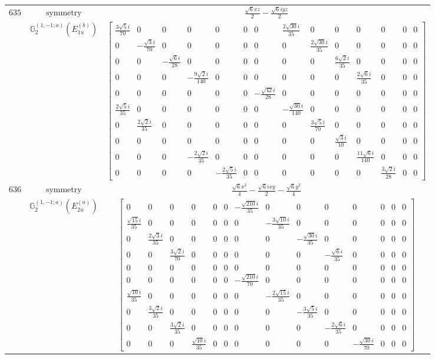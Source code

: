 \documentclass[fleqn,8pt,landscape]{jsarticle}
\begin{document}
\begin{longtable}{ccc}
$ 635 $ & $ \text{symmetry} $ & $ \frac{\sqrt{6} x z}{2} - \frac{\sqrt{6} i y z}{2} $ \\
$  $ & $ \mathbb{G}_{2}^{(1,-1;a)}(E_{1u}^{(b)}) $ & $ \begin{bmatrix} \frac{3 \sqrt{5} i}{70} & 0 & 0 & 0 & 0 & 0 & 0 & \frac{2 \sqrt{30} i}{35} & 0 & 0 & 0 & 0 & 0 & 0 \\ 0 & - \frac{\sqrt{3} i}{70} & 0 & 0 & 0 & 0 & 0 & 0 & \frac{2 \sqrt{30} i}{35} & 0 & 0 & 0 & 0 & 0 \\ 0 & 0 & - \frac{\sqrt{6} i}{28} & 0 & 0 & 0 & 0 & 0 & 0 & \frac{6 \sqrt{2} i}{35} & 0 & 0 & 0 & 0 \\ 0 & 0 & 0 & - \frac{9 \sqrt{2} i}{140} & 0 & 0 & 0 & 0 & 0 & 0 & \frac{2 \sqrt{6} i}{35} & 0 & 0 & 0 \\ 0 & 0 & 0 & 0 & 0 & 0 & - \frac{\sqrt{42} i}{28} & 0 & 0 & 0 & 0 & 0 & 0 & 0 \\ \frac{2 \sqrt{5} i}{35} & 0 & 0 & 0 & 0 & 0 & 0 & - \frac{\sqrt{30} i}{140} & 0 & 0 & 0 & 0 & 0 & 0 \\ 0 & \frac{2 \sqrt{2} i}{35} & 0 & 0 & 0 & 0 & 0 & 0 & \frac{3 \sqrt{5} i}{70} & 0 & 0 & 0 & 0 & 0 \\ 0 & 0 & 0 & 0 & 0 & 0 & 0 & 0 & 0 & \frac{\sqrt{3} i}{10} & 0 & 0 & 0 & 0 \\ 0 & 0 & 0 & - \frac{2 \sqrt{2} i}{35} & 0 & 0 & 0 & 0 & 0 & 0 & \frac{11 \sqrt{6} i}{140} & 0 & 0 & 0 \\ 0 & 0 & 0 & 0 & - \frac{2 \sqrt{5} i}{35} & 0 & 0 & 0 & 0 & 0 & 0 & \frac{3 \sqrt{2} i}{28} & 0 & 0 \end{bmatrix} $ \\ \hline
$ 636 $ & $ \text{symmetry} $ & $ \frac{\sqrt{6} x^{2}}{4} - \frac{\sqrt{6} i x y}{2} - \frac{\sqrt{6} y^{2}}{4} $ \\
$  $ & $ \mathbb{G}_{2}^{(1,-1;a)}(E_{2u}^{(a)}) $ & $ \begin{bmatrix} 0 & 0 & 0 & 0 & 0 & 0 & - \frac{\sqrt{210} i}{35} & 0 & 0 & 0 & 0 & 0 & 0 & 0 \\ \frac{\sqrt{15} i}{35} & 0 & 0 & 0 & 0 & 0 & 0 & - \frac{3 \sqrt{10} i}{35} & 0 & 0 & 0 & 0 & 0 & 0 \\ 0 & \frac{2 \sqrt{3} i}{35} & 0 & 0 & 0 & 0 & 0 & 0 & - \frac{\sqrt{30} i}{35} & 0 & 0 & 0 & 0 & 0 \\ 0 & 0 & \frac{3 \sqrt{2} i}{70} & 0 & 0 & 0 & 0 & 0 & 0 & - \frac{\sqrt{6} i}{35} & 0 & 0 & 0 & 0 \\ 0 & 0 & 0 & 0 & 0 & 0 & 0 & 0 & 0 & 0 & 0 & 0 & 0 & 0 \\ 0 & 0 & 0 & 0 & 0 & 0 & - \frac{\sqrt{210} i}{70} & 0 & 0 & 0 & 0 & 0 & 0 & 0 \\ \frac{\sqrt{10} i}{35} & 0 & 0 & 0 & 0 & 0 & 0 & - \frac{2 \sqrt{15} i}{35} & 0 & 0 & 0 & 0 & 0 & 0 \\ 0 & \frac{3 \sqrt{2} i}{35} & 0 & 0 & 0 & 0 & 0 & 0 & - \frac{3 \sqrt{5} i}{35} & 0 & 0 & 0 & 0 & 0 \\ 0 & 0 & \frac{3 \sqrt{2} i}{35} & 0 & 0 & 0 & 0 & 0 & 0 & - \frac{2 \sqrt{6} i}{35} & 0 & 0 & 0 & 0 \\ 0 & 0 & 0 & \frac{\sqrt{10} i}{35} & 0 & 0 & 0 & 0 & 0 & 0 & - \frac{\sqrt{30} i}{70} & 0 & 0 & 0 \end{bmatrix} $ \\ \hline

\end{longtable}
\end{document}
